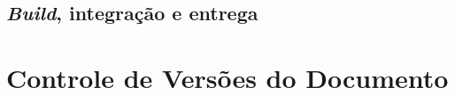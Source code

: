 \documentclass[a4paper,12pt,oneside,openany]{book}
\newif\iforientacoes
\newcommand{\orientacao}[1]{%
    \iforientacoes
        \begin{quote}
        \small\itshape\textbf{Orientação:} #1
        \end{quote}
    \fi
}
\begin{document}
\section{\textit{Build}, integração e entrega}

\orientacao{Descrevam como o software é construído e executado. Se houver
automação de \textit{build}, testes, integração contínua ou
entrega/\textit{deploy}, apresentem o fluxo adotado e as ferramentas
envolvidas. Caso essas práticas não sejam utilizadas, expliquem brevemente
como o processo é realizado manualmente.}

%

%
%

\chapter*{Controle de Versões do Documento}
\end{document}
